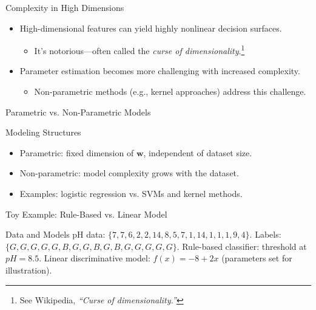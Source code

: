 \documentclass[10pt]{beamer}
\begin{document}
\begin{frame}{Complexity in High Dimensions}
    \justifying
    \begin{itemize}
        \item High-dimensional features can yield highly nonlinear decision surfaces.
        \begin{itemize}
            \item It's notorious---often called the \emph{curse of dimensionality}.\footnote{See Wikipedia, \emph{``Curse of dimensionality.''}}
        \end{itemize}
        \item Parameter estimation becomes more challenging with increased complexity.
        \begin{itemize}
            \item Non-parametric methods (e.g., kernel approaches) address this challenge.
        \end{itemize}
    \end{itemize}
\end{frame}

\begin{frame}{Parametric vs. Non-Parametric Models}
    \justifying
    \begin{conceptbox}{Modeling Structures}
        \begin{itemize}
            \item Parametric: fixed dimension of $\bm{w}$, independent of dataset size.
            \item Non-parametric: model complexity grows with the dataset.
        \end{itemize}
    \end{conceptbox}
    \begin{itemize}
        \item Examples: logistic regression vs. SVMs and kernel methods.
    \end{itemize}
\end{frame}

\begin{frame}{Toy Example: Rule-Based vs. Linear Model}
    \justifying
    \begin{examplebox}{Data and Models}
        pH data: $\{7, 7, 6, 2, 2, 14, 8, 5, 7, 1, 14, 1, 1, 1, 9, 4\}$.
        Labels: $\{G, G, G, G, G, B, G, G, B, G, B, G, G, G, G, G\}$.
        Rule-based classifier: threshold at $pH=8.5$.
        Linear discriminative model: $f(x) = -8 + 2x$ (parameters set for illustration).
    \end{examplebox}
\end{frame}
\end{document}
